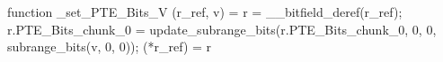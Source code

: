 function _set_PTE_Bits_V (r_ref, v) = {
    r = __bitfield_deref(r_ref);
    r.PTE_Bits_chunk_0 = update_subrange_bits(r.PTE_Bits_chunk_0, 0, 0, subrange_bits(v, 0, 0));
    (*r_ref) = r
}
